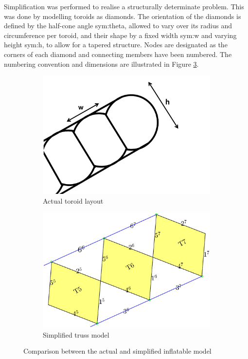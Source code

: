 Simplification was performed to realise a structurally determinate problem. This was done by modelling toroids as diamonds. The orientation of the diamonds is defined by the half-cone angle \gls{sym:theta}, allowed to vary over its radius and circumference per toroid, and their shape by a fixed width \gls{sym:w} and varying height \gls{sym:h}, to allow for a tapered structure. Nodes are designated as the corners of each diamond and connecting members have been numbered. The numbering convention and dimensions are illustrated in Figure \ref{fig:TC}. 

\begin{figure}[h]
	\centering
	\begin{subfigure}[b]{0.49\textwidth}
	\centering
	\includegraphics[width=1.0\linewidth]{./Figure/Structure/torconf.pdf}
	\caption{Actual toroid layout} 
	\label{fig:TC1}
	\end{subfigure}
	\begin{subfigure}[b]{0.49\textwidth}
	\centering
	\includegraphics[width=1.0\linewidth]{./Figure/Structure/ToroidConfig2.eps}
	\caption{Simplified truss model} 
	\label{fig:TC2}
	\end{subfigure}
	\caption{Comparison between the actual and simplified inflatable model}
	\label{fig:TC}
\end{figure}

